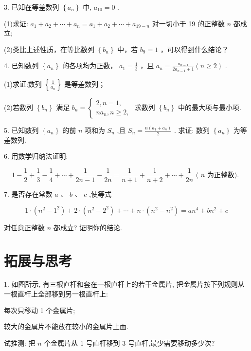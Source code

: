\documentclass[10pt]{article}
\newcommand*\circled[1]{\tikz[baseline=(char.base)]{\node[shape=circle,draw,inner sep=1.5pt] (char) {\small #1};}}
\begin{document}
3. 已知在等差数列 \(\left\{  {a}_{n}\right\}\) 中, \({a}_{10} = 0\) .

(1)求证: \({a}_{1} + {a}_{2} + \cdots  + {a}_{n} = {a}_{1} + {a}_{2} + \cdots  + {a}_{{19} - n}\) 对一切小于 19 的正整数 \(n\) 都成立;

(2)类比上述性质，在等比数列 \(\left\{  {b}_{n}\right\}\) 中，若 \({b}_{9} = 1\) ，可以得到什么结论？

4. 已知数列 \(\left\{  {a}_{n}\right\}\) 的各项均为正数， \({a}_{1} = \frac{1}{3}\) ，且 \({a}_{n} = \frac{{a}_{n - 1}}{2{a}_{n - 1} + 1}\left( {n \geq  2}\right)\) .

(1)求证:数列 \(\left\{  \frac{1}{{a}_{n}}\right\}\) 是等差数列；

(2)若数列 \(\left\{  {b}_{n}\right\}\) 满足 \({b}_{n} = \left\{  \begin{array}{l} 2,n = 1, \\  n{a}_{n},n \geq  2, \end{array}\right.\) 求数列 \(\left\{  {b}_{n}\right\}\) 中的最大项与最小项.

5. 已知数列 \(\left\{  {a}_{n}\right\}\) 的前 \(n\) 项和为 \({S}_{n}\) ,且 \({S}_{n} = \frac{n\left( {{a}_{1} + {a}_{n}}\right) }{2}\) . 求证: 数列 \(\left\{  {a}_{n}\right\}\) 为等差数列.

6. 用数学归纳法证明:

\[
1 - \frac{1}{2} + \frac{1}{3} - \frac{1}{4} + \cdots  + \frac{1}{{2n} - 1} - \frac{1}{2n} = \frac{1}{n + 1} + \frac{1}{n + 2} + \cdots  + \frac{1}{2n}\text{ ( }n\text{ 为正整数). }
\]

7. 是否存在常数 \(a\text{ 、 }b\text{ 、 }c\) ,使等式

\[
1 \cdot  \left( {{n}^{2} - {1}^{2}}\right)  + 2 \cdot  \left( {{n}^{2} - {2}^{2}}\right)  + \cdots  + n \cdot  \left( {{n}^{2} - {n}^{2}}\right)  = a{n}^{4} + b{n}^{2} + c
\]

对任意正整数 \(n\) 都成立? 证明你的结论.

\section*{拓展与思考}

1. 如图所示, 有三根直杆和套在一根直杆上的若干金属片, 把金属片按下列规则从一根直杆上全部移到另一根直杆上:

 \circled{1}  每次只移动 1 个金属片;

 \circled{2}  较大的金属片不能放在较小的金属片上面.

试推测: 把 \(n\) 个金属片从 1 号直杆移到 3 号直杆,最少需要移动多少次?
\end{document}
